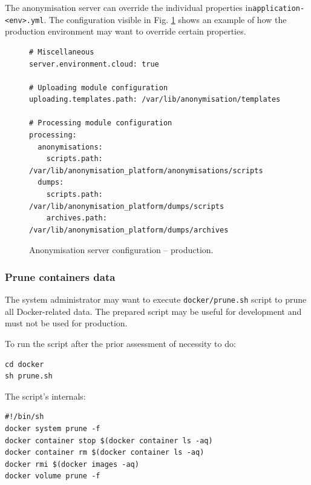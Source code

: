 \documentclass[a4paper,twoside,12pt]{book}
\begin{document}
The anonymisation server can override the individual properties in\newline \verb|application-<env>.yml|. The configuration visible in Fig. \ref{fig:code:application_prod_yml} shows an example of how the production environment may want to override certain properties.

\begin{figure}[H]
\begin{verbatim}
# Miscellaneous
server.environment.cloud: true

# Uploading module configuration
uploading.templates.path: /var/lib/anonymisation/templates

# Processing module configuration
processing:
  anonymisations:
    scripts.path: /var/lib/anonymisation_platform/anonymisations/scripts
  dumps:
    scripts.path: /var/lib/anonymisation_platform/dumps/scripts
    archives.path: /var/lib/anonymisation_platform/dumps/archives
\end{verbatim}
\caption{Anonymisation server configuration -- production.}
\label{fig:code:application_prod_yml}
\end{figure}

\subsubsection{Prune containers data}

The system administrator may want to execute \verb|docker/prune.sh| script to prune all Docker-related data. The prepared script may be useful for development and must not be used for production.

To run the script after the prior assessment of necessity to do:
\begin{verbatim}
cd docker
sh prune.sh
\end{verbatim}

The script's internals:
\begin{verbatim}
#!/bin/sh
docker system prune -f
docker container stop $(docker container ls -aq)
docker container rm $(docker container ls -aq)
docker rmi $(docker images -aq)
docker volume prune -f
\end{verbatim}
\end{document}
